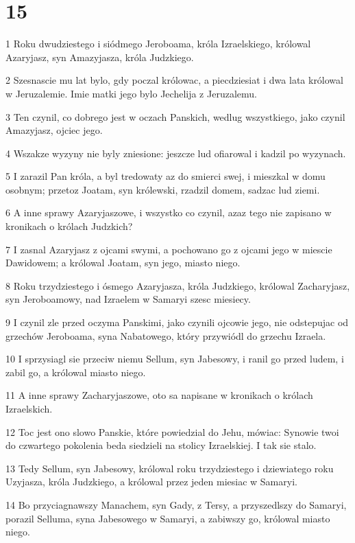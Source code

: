 \chapter{15}

\par 1 Roku dwudziestego i siódmego Jeroboama, króla Izraelskiego, królowal Azaryjasz, syn Amazyjasza, króla Judzkiego.
\par 2 Szesnascie mu lat bylo, gdy poczal królowac, a piecdziesiat i dwa lata królowal w Jeruzalemie. Imie matki jego bylo Jechelija z Jeruzalemu.
\par 3 Ten czynil, co dobrego jest w oczach Panskich, wedlug wszystkiego, jako czynil Amazyjasz, ojciec jego.
\par 4 Wszakze wyzyny nie byly zniesione: jeszcze lud ofiarowal i kadzil po wyzynach.
\par 5 I zarazil Pan króla, a byl tredowaty az do smierci swej, i mieszkal w domu osobnym; przetoz Joatam, syn królewski, rzadzil domem, sadzac lud ziemi.
\par 6 A inne sprawy Azaryjaszowe, i wszystko co czynil, azaz tego nie zapisano w kronikach o królach Judzkich?
\par 7 I zasnal Azaryjasz z ojcami swymi, a pochowano go z ojcami jego w miescie Dawidowem; a królowal Joatam, syn jego, miasto niego.
\par 8 Roku trzydziestego i ósmego Azaryjasza, króla Judzkiego, królowal Zacharyjasz, syn Jeroboamowy, nad Izraelem w Samaryi szesc miesiecy.
\par 9 I czynil zle przed oczyma Panskimi, jako czynili ojcowie jego, nie odstepujac od grzechów Jeroboama, syna Nabatowego, który przywiódl do grzechu Izraela.
\par 10 I sprzysiagl sie przeciw niemu Sellum, syn Jabesowy, i ranil go przed ludem, i zabil go, a królowal miasto niego.
\par 11 A inne sprawy Zacharyjaszowe, oto sa napisane w kronikach o królach Izraelskich.
\par 12 Toc jest ono slowo Panskie, które powiedzial do Jehu, mówiac: Synowie twoi do czwartego pokolenia beda siedzieli na stolicy Izraelskiej. I tak sie stalo.
\par 13 Tedy Sellum, syn Jabesowy, królowal roku trzydziestego i dziewiatego roku Uzyjasza, króla Judzkiego, a królowal przez jeden miesiac w Samaryi.
\par 14 Bo przyciagnawszy Manachem, syn Gady, z Tersy, a przyszedlszy do Samaryi, porazil Selluma, syna Jabesowego w Samaryi, a zabiwszy go, królowal miasto niego.
